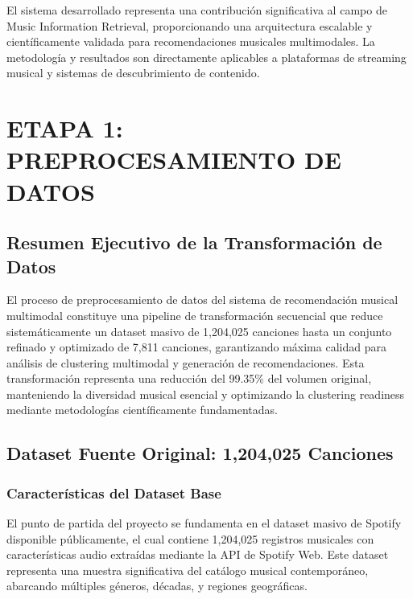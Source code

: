 \documentclass[12pt,a4paper]{report}
\begin{document}
El sistema desarrollado representa una contribución significativa al campo de Music Information Retrieval, proporcionando una arquitectura escalable y científicamente validada para recomendaciones musicales multimodales. La metodología y resultados son directamente aplicables a plataformas de streaming musical y sistemas de descubrimiento de contenido.

\tableofcontents
\newpage

\chapter{ETAPA 1: PREPROCESAMIENTO DE DATOS}

\section{Resumen Ejecutivo de la Transformación de Datos}

El proceso de preprocesamiento de datos del sistema de recomendación musical multimodal constituye una pipeline de transformación secuencial que reduce sistemáticamente un dataset masivo de 1,204,025 canciones hasta un conjunto refinado y optimizado de 7,811 canciones, garantizando máxima calidad para análisis de clustering multimodal y generación de recomendaciones. Esta transformación representa una reducción del 99.35\% del volumen original, manteniendo la diversidad musical esencial y optimizando la clustering readiness mediante metodologías científicamente fundamentadas.

\section{Dataset Fuente Original: 1,204,025 Canciones}

\subsection{Características del Dataset Base}

El punto de partida del proyecto se fundamenta en el dataset masivo de Spotify disponible públicamente, el cual contiene 1,204,025 registros musicales con características audio extraídas mediante la API de Spotify Web. Este dataset representa una muestra significativa del catálogo musical contemporáneo, abarcando múltiples géneros, décadas, y regiones geográficas.
\end{document}
